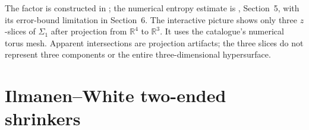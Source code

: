 \begin{example}
\begin{itemize}
\end{itemize}
The factor is constructed in \cite{CatAngenent1992}; the numerical entropy estimate is \cite{CatBerchenkoKogan2021}, Section~5, with its error-bound limitation in Section~6. The interactive picture shows only three $z$-slices of $\Sigma_1$ after projection from $\mathbb R^4$ to $\mathbb R^3$. It uses the catalogue's numerical torus mesh. Apparent intersections are projection artifacts; the three slices do not represent three components or the entire three-dimensional hypersurface.
\end{example}

\chapter{Ilmanen--White two-ended shrinkers}\label{sec:catalogue-iw-two-ended}
